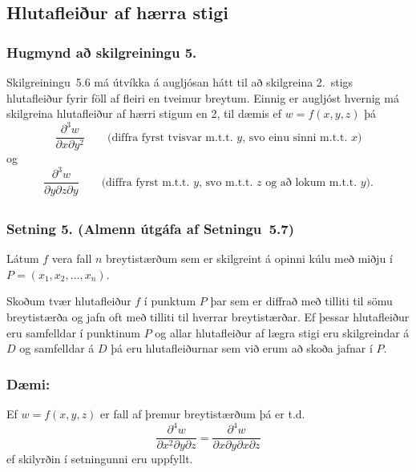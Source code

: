 \subsection{Hlutafleiður af hærra stigi}
 \subsubsection{Hugmynd að skilgreiningu 5.}
  Skilgreiningu~5.6 má útvíkka á augljósan hátt
til að skilgreina 2.~stigs hlutafleiður fyrir föll af fleiri en
tveimur breytum.   Einnig er augljóst hvernig má skilgreina
hlutafleiður af hærri stigum en 2, til dæmis ef $w=f(x,y,z)$ þá 
$$\frac{\partial^3 w}{\partial x\partial y^2} \quad\quad\mbox{(diffra
    fyrst tvisvar m.t.t. }y\mbox{, svo einu sinni m.t.t. } x\mbox{)}$$
og 
$$\frac{\partial^3 w}{\partial y\partial z\partial y} \quad\quad\mbox{(diffra
    fyrst m.t.t. } y\mbox{, svo m.t.t. } z
\mbox{ og að lokum m.t.t. }y\mbox{)}.$$

 



\subsection{}
 \subsubsection{Setning 5. (Almenn útgáfa af Setningu~5.7)}
     Látum $f$ vera
fall $n$ breytistærðum sem er skilgreint á opinni kúlu með miðju í 
$P=(x_1, x_2,\ldots, x_n)$.  

\medskip
Skoðum tvær hlutafleiður $f$ í punktum $P$
þar sem er diffrað með tilliti til sömu breytistærða og jafn oft með
tilliti til hverrar breytistærðar.  Ef þessar hlutafleiður eru
samfelldar í punktinum $P$ og allar hlutafleiður af lægra stigi eru
skilgreindar á $D$ og samfelldar á $D$ þá eru hlutafleiðurnar sem við
erum að skoða jafnar í $P$.
 
\pause
 \subsubsection {Dæmi:} 
 Ef $w = f(x,y,z)$ er fall af þremur breytistærðum þá er t.d.~
 \begin {equation*}
  \frac{\partial^4 w}{\partial x^2\partial y \partial z} = \frac{\partial^4 w}{\partial x \partial y \partial x \partial z}
 \end {equation*}
ef skilyrðin í setningunni eru uppfyllt.
  
 





